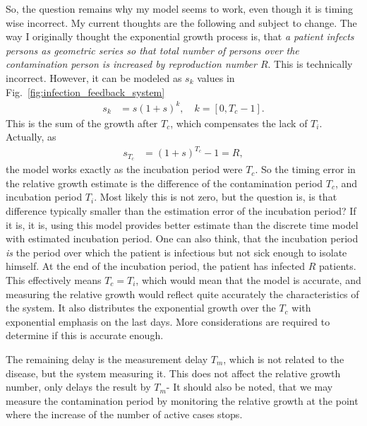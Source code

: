 So, the
question remains why my model seems to work, even though it is timing wise
incorrect. My current thoughts are the following and subject to change. The
way I originally thought the exponential growth process is, that \emph{a
    patient infects persons as geometric series so that total number of persons over the
contamination person is increased by reproduction number $R$}. This is technically incorrect.
However, it can be modeled as $s_k$  values in Fig.~\ref{fig:infection_feedback_system}
\begin{align}
    s_k&=s\left(1+s\right)^k, \quad k=\left[0,T_c-1\right].
\end{align}
This is the  sum of the growth after $T_c$, which compensates the lack of $T_i$.
Actually, as  
\begin{align}
    s_{T_c}&=\left(1+s\right)^{T_c}-1=R,
\end{align}
the model works exactly as the incubation period were $T_c$. So the timing
error in the relative growth estimate is the difference of the contamination
period $T_c$, and incubation period $T_i$. Most likely this is not zero, but
the question is, is that difference typically smaller than the estimation
error of the incubation period? If it is, it is, using this model provides
better estimate than the discrete time model with estimated
incubation period. One can also think, that the incubation period \emph{is}
the period over which the patient is infectious but not sick enough to isolate
himself. At the end of the incubation period, the patient has infected $R$
patients. This effectively means $T_c=T_i$, which would mean that the model is
accurate, and measuring the relative growth would reflect quite accurately the
characteristics of the system. It also distributes the exponential growth
over the $T_c$ with exponential emphasis on the last days. More considerations
are required to determine if this is accurate enough.

The remaining delay is the measurement delay
$T_m$, which is not related to the disease, but the system measuring it. This
does not affect the relative growth number, only delays the result by $T_m$-
It should also be noted, that we may measure the contamination period by
monitoring the relative growth at the point where the increase of the number
of active cases stops. 

